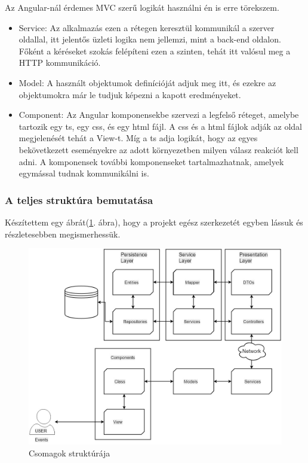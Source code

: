 Az Angular-nál érdemes MVC szerű logikát használni én is erre törekszem. 

\begin{itemize}

\item Service: Az alkalmazás ezen a rétegen keresztül kommunikál a szerver oldallal, itt jelentős üzleti logika nem jellemzi, mint a back-end oldalon. Főként a kéréseket szokás felépíteni ezen a szinten, tehát itt valósul meg a HTTP kommunikáció.

\item Model: A használt objektumok definícióját adjuk meg itt, és ezekre az objektumokra már le tudjuk képezni a kapott eredményeket.

\item Component:  Az Angular komponensekbe szervezi a legfelső réteget, amelybe tartozik egy ts, egy css, és egy html fájl. A css és a html fájlok adják az oldal megjelenését tehát a View-t. Míg a ts adja logikát, hogy az egyes bekövetkezett eseményekre az adott környezetben milyen válasz reakciót kell adni. A komponensek további komponenseket tartalmazhatnak, amelyek egymással tudnak kommunikálni is.

\end{itemize}

\subsubsection{A teljes struktúra bemutatása}
Készítettem egy ábrát(\ref{fig:mvc}. ábra), hogy a projekt egész szerkezetét egyben lássuk és részletesebben megismerhessük.

\begin{figure}
\centering
\includegraphics[scale=0.47]{kepek/mvc_arch.jpg}
\caption{Csomagok struktúrája}
\label{fig:mvc}
\end{figure}


